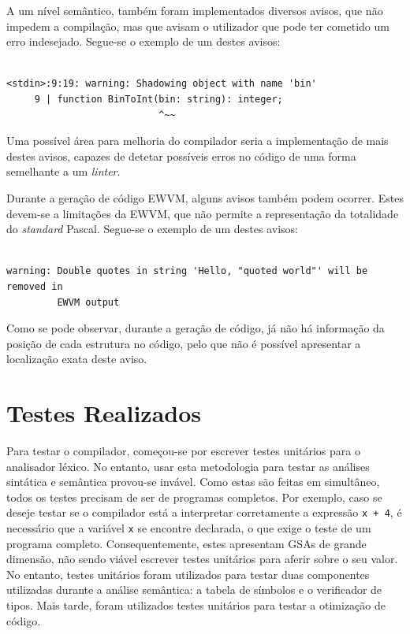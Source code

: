 \documentclass[12pt, a4paper]{article}
\begin{document}
A um nível semântico, também foram implementados diversos avisos, que não impedem a compilação, mas
que avisam o utilizador que pode ter cometido um erro indesejado. Segue-se o exemplo de um destes
avisos:


\begin{lstlisting}

<stdin>:9:19: warning: Shadowing object with name 'bin'
     9 | function BinToInt(bin: string): integer;
                           ^~~
\end{lstlisting}

Uma possível área para melhoria do compilador seria a implementação de mais destes avisos, capazes
de detetar possíveis erros no código de uma forma semelhante a um \emph{linter}.

Durante a geração de código EWVM, alguns avisos também podem ocorrer. Estes devem-se a limitações da
EWVM, que não permite a representação da totalidade do \emph{standard} Pascal. Segue-se o exemplo de
um destes avisos:

\begin{lstlisting}

warning: Double quotes in string 'Hello, "quoted world"' will be removed in
         EWVM output
\end{lstlisting}

Como se pode observar, durante a geração de código, já não há informação da posição de cada
estrutura no código, pelo que não é possível apresentar a localização exata deste aviso.

\section{Testes Realizados}

Para testar o compilador, começou-se por escrever testes unitários para o analisador léxico. No
entanto, usar esta metodologia para testar as análises sintática e semântica provou-se invável. Como
estas são feitas em simultâneo, todos os testes precisam de ser de programas completos. Por exemplo,
caso se deseje testar se o compilador está a interpretar corretamente a expressão \texttt{x + 4}, é
necessário que a variável \texttt{x} se encontre declarada, o que exige o teste de um programa
completo. Consequentemente, estes apresentam GSAs de grande dimensão, não sendo viável escrever
testes unitários para aferir sobre o seu valor. No entanto, testes unitários foram utilizados para
testar duas componentes utilizadas durante a análise semântica: a tabela de símbolos e o verificador
de tipos. Mais tarde, foram utilizados testes unitários para testar a otimização de código.
\end{document}
